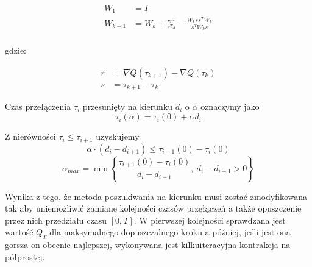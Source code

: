 \documentclass[11pt]{mwart}
\begin{document}
\begin{equation}
	\label{eq-bfgs}
	\begin{split}
		W_{1} &= I \\
		W_{k+1} &= W_{k} + \frac{rr^{T}}{r^{T}s}-\frac{W_{k}ss^{T}W_{k}}{s^{T}W_{k}s} \\
	\end{split}
\end{equation}

gdzie:

\begin{equation}
	\label{eq-rs}
	\begin{split}
		r &= \nabla Q\left(\tau_{k+1}\right)-\nabla Q\left(\tau_{k}\right) \\
		s &= \tau_{k+1} - \tau_{k}
	\end{split}
\end{equation}



Czas przełączenia $\tau_{i}$ przesunięty na kierunku $d_{i}$ o $\alpha$ oznaczymy jako
\begin{equation}
	\tau_{i}\left(\alpha\right)=\tau_{i}\left(0\right)+\alpha d_{i}
\end{equation}

Z nierówności $\tau_{i}\leq\tau_{i+1}$ uzyskujemy
\begin{equation}
	\alpha\cdot\left(d_{i}-d_{i+1}\right)\leq\tau_{i+1}\left(0\right)-\tau_{i}\left(0\right)
\end{equation}
\begin{equation}
	\alpha_{max} = \min\left\{\frac{\tau_{i+1}\left(0\right)-\tau_{i}\left(0\right)}{d_{i}-d_{i+1}},\ d_{i}-d_{i+1}>0\right\}
\end{equation}

Wynika z tego, że metoda poszukiwania na kierunku musi zostać zmodyfikowana tak aby uniemożliwić zamianę kolejności czasów przęłączeń a także opuszczenie przez nich przedziału czasu $[0,T]$. W pierwszej kolejności sprawdzana jest wartość $Q_{T}$ dla maksymalnego dopuszczalnego kroku a później, jeśli jest ona gorsza on obecnie najlepszej, wykonywana jest kilkuiteracyjna kontrakcja na półprostej.
\end{document}

